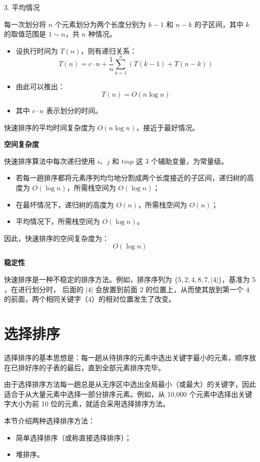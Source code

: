 \documentclass[lang=cn,newtx,10pt,scheme=chinese]{../elegantbook}
\begin{document}
3. 平均情况  

   每一次划分将 $n$ 个元素划分为两个长度分别为 $k-1$ 和 $n-k$ 的子区间，其中 $k$ 的取值范围是 $1 \sim n$，共 $n$ 种情况。  
   \begin{itemize}
     \item 设执行时间为 $T(n)$，则有递归关系：
       \[
       T(n) = c \cdot n + \frac{1}{n} \sum_{k=1}^n \left(T(k-1) + T(n-k)\right)
       \]
     \item 由此可以推出：
       \[
       T(n) = O(n \log n)
       \]
     \item 其中 $c \cdot n$ 表示划分的时间。
   \end{itemize}

快速排序的平均时间复杂度为 $O(n \log n)$，接近于最好情况。


\textbf{空间复杂度}  

快速排序算法中每次递归使用 $i$、$j$ 和 $tmp$ 这 3 个辅助变量，为常量级。  
\begin{itemize}
  \item 若每一趟排序都将元素序列均匀地分割成两个长度接近的子区间，递归树的高度为 $O(\log n)$，所需栈空间为 $O(\log n)$；
  \item 在最坏情况下，递归树的高度为 $O(n)$，所需栈空间为 $O(n)$；
  \item 平均情况下，所需栈空间为 $O(\log n)$。
\end{itemize}
因此，快速排序的空间复杂度为：
\[
O(\log n)
\]


\textbf{稳定性}  

快速排序是一种不稳定的排序方法。例如，排序序列为 $\{5, 2, 4, 8, 7, |4|\}$，基准为 $5$，在进行划分时，
后面的 $|4|$ 会放置到前面 $2$ 的位置上，从而使其放到第一个 $4$ 的前面，两个相同关键字（$4$）的相对位置发生了改变。

\section{选择排序}
选择排序的基本思想是：每一趟从待排序的元素中选出关键字最小的元素，顺序放在已排好序的子表的最后，直到全部元素排序完毕。

由于选择排序方法每一趟总是从无序区中选出全局最小（或最大）的关键字，因此适合于从大量元素中选择一部分排序元素。例如，从 10,000 个元素中选择出关键字大小为前 10 位的元素，就适合采用选择排序方法。

本节介绍两种选择排序方法：
\begin{itemize}
  \item 简单选择排序（或称直接选择排序）；
  \item 堆排序。
\end{itemize}
\end{document}
